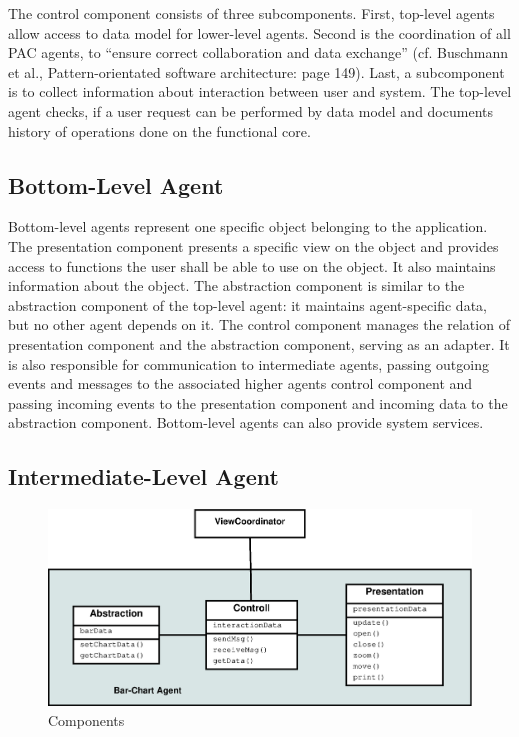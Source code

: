 \documentclass{scrbook}
\begin{document}
The control component consists of three subcomponents. First, top-level agents allow access to data
model for lower-level agents. Second is the coordination of all PAC agents, to “ensure correct
collaboration and data exchange” (cf. Buschmann et al., Pattern-orientated software architecture:
page 149). Last, a subcomponent is to collect information about interaction between user and
system. The top-level agent checks, if a user request can be performed by data model and
documents history of operations done on the functional core.



\subsection{Bottom-Level Agent}	%


Bottom-level agents represent one specific object belonging to the application. The presentation component presents a specific view on the object and provides access to functions the user shall be able to use on the object. It also maintains information about the object. The abstraction component is similar to the abstraction component of the top-level agent: it maintains agent-specific data, but no other agent depends on it. The control component manages the relation of presentation component and the abstraction component, serving as an adapter. It is also responsible for communication to intermediate agents, passing outgoing events and messages to the associated higher agents control component and passing incoming events to the presentation component and incoming data to the abstraction component. Bottom-level agents can also provide system services. 


\subsection{Intermediate-Level Agent}

\begin{figure}
 \begin{center}
\includegraphics[width=.8\textwidth]{./pics/Components.eps}\end{center}
\caption[Comp]{Components\endnotemark[1]}
\end{figure}
\end{document}

